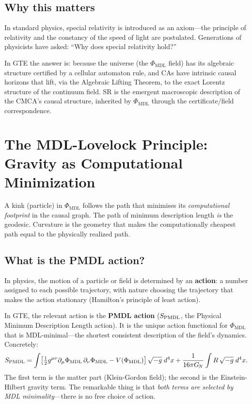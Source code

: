 \documentclass[11pt,a4paper]{article}
\newcommand{\term}[1]{\textbf{#1}}
\newcommand{\GN}{G_{\!N}}
\newcommand{\PHIMDL}{\Phi_{\mathrm{MDL}}}
\begin{document}
\subsection{Why this matters}

In standard physics, special relativity is introduced as an axiom---the principle
of relativity and the constancy of the speed of light are postulated.
Generations of physicists have asked: ``Why does special relativity hold?''

In GTE the answer is: because the universe (the $\PHIMDL$ field) has its algebraic
structure certified by a cellular automaton rule, and CAs have intrinsic causal
horizons that lift, via the Algebraic Lifting Theorem, to the exact Lorentz structure
of the continuum field.  SR is the emergent macroscopic description of the CMCA's
causal structure, inherited by $\PHIMDL$ through the certificate/field correspondence.

\section{The MDL-Lovelock Principle: Gravity as Computational Minimization}

\begin{tcolorbox}[colback=boxorange,colframe=orange!60!black,title=The central GTE insight about gravity]
A kink (particle) in $\PHIMDL$ follows the path that minimises its
\textit{computational footprint} in the causal graph.
The path of minimum description length \emph{is} the geodesic.
Curvature is the geometry that makes the computationally cheapest path
equal to the physically realized path.
\end{tcolorbox}

\subsection{What is the PMDL action?}

In physics, the motion of a particle or field is determined by an \term{action}:
a number assigned to each possible trajectory, with nature choosing the trajectory
that makes the action stationary (Hamilton's principle of least action).

In GTE, the relevant action is the \term{PMDL action} ($S_{\rm PMDL}$, the
Physical Minimum Description Length action).  It is the unique action functional
for $\PHIMDL$ that is MDL-minimal---the shortest consistent description of the
field's dynamics.  Concretely:
\[
  S_{\rm PMDL} = \int \!\left[\tfrac{1}{2}g^{\mu\nu}\partial_\mu\PHIMDL\,\partial_\nu\PHIMDL
               - V(\PHIMDL)\right]\sqrt{-g}\;d^4x
               + \frac{1}{16\pi\GN}\int R\,\sqrt{-g}\;d^4x.
\]
The first term is the matter part (Klein-Gordon field); the second is the
Einstein-Hilbert gravity term.  The remarkable thing is that \emph{both terms are
selected by MDL minimality}---there is no free choice of action.
\end{document}
